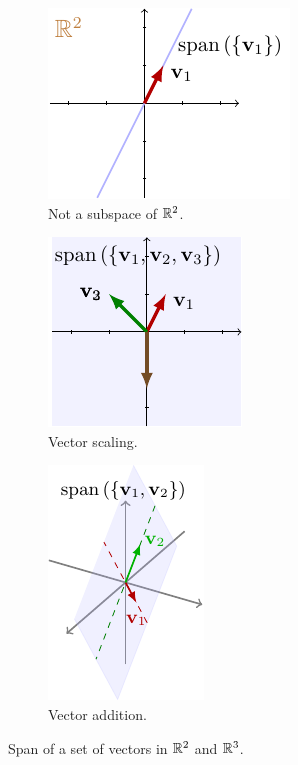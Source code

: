 \begin{figure}[h]
    \centering
    \begin{subfigure}[b]{0.32\textwidth}
        \includegraphics{figure/chapter01/span(a).pdf}
        \caption{Not a subspace of $\mathbb{R}^2$.}
        \label{fig:span1}
    \end{subfigure}
    \begin{subfigure}[b]{0.32\textwidth}
        \centering
        \includegraphics{figure/chapter01/span(b).pdf}
        \caption{Vector scaling.}
        \label{fig:span2}
    \end{subfigure}
    \begin{subfigure}[b]{0.32\textwidth}
        \centering
        \includegraphics{figure/chapter01/span(c).pdf}
        \caption{Vector addition.}
        \label{fig:span3}
    \end{subfigure}
    \caption{Span of a set of vectors in $\mathbb{R}^2$ and $\mathbb{R}^3$.}
\end{figure}

